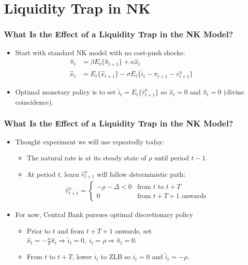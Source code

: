 \documentclass[english,xcolor=svgnames]{beamer}
\begin{document}
\section{Liquidity Trap in NK}


\begin{frame}
\frametitle{What Is the Effect of a Liquidity Trap in the NK Model?}
\begin{itemize}
	\item Start with standard NK model with no cost-push shocks:
	\begin{align*}
			\hat{\pi}_t &=\beta E_t\{\hat{\pi}_{t+1}\}+\kappa \hat{x}_t \\
			\hat{x}_t &=E_t\{\hat{x}_{t+1}\} -\sigma E_t\{\hat{i}_t - \hat{\pi}_{t+1} - r_{t+1}^n\}
		\end{align*}
	\item Optimal monetary policy is to set $\hat{i}_t=E_t\{\hat{r}_{t+1}^{n}\}$ so $\hat{x}_t=0$ and $\hat{\pi}_t=0$ (divine coincidence).
	
\end{itemize}
\end{frame}


\begin{frame}
\frametitle{What Is the Effect of a Liquidity Trap in the NK Model?}
\begin{itemize}
	\item Thought experiment we will use repeatedly today:
	\begin{itemize}
		\item The natural rate is at its steady state of $\rho$ until period $t-1$.
		\item At period $t$, learn $\hat{r}_{t+1}^n$ will follow deterministic path:
		\begin{align*}
			\hat{r}_{t+1}^n =  \begin{cases} -\rho-\Delta<0 & \text{from } t \text{ to } t+T \\  0 & \text{from } t+T+1 \text{ onwards}\end{cases}
		\end{align*}
	\end{itemize}	
	\item For now, Central Bank pursues optimal discretionary policy
	\begin{itemize}
		\item Prior to $t$ and from $t +T +1$ onwards, set $\hat{x}_t=-\frac{\kappa}{\vartheta}\hat{\pi}_t \Rightarrow\hat{i}_t=0,\; i_{t}=\rho  \Rightarrow \hat{\pi}_t=0$.
		\item From $t$ to $t+T$, lower $i_t$ to ZLB so $i_t=0$ and $\hat{i}_t=-\rho$.
	\end{itemize}	
\end{itemize}
\end{frame}
\end{document}
